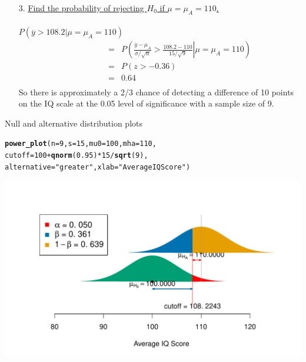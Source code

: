 \documentclass[10pt]{beamer}\usepackage[]{graphicx}\usepackage[]{color}
\makeatletter
\def\maxwidth{ %
  \ifdim\Gin@nat@width>\linewidth
    \linewidth
  \else
    \Gin@nat@width
  \fi
}
\newcommand{\hlnum}[1]{\textcolor[rgb]{0.686,0.059,0.569}{#1}}%
\newcommand{\hlstr}[1]{\textcolor[rgb]{0.192,0.494,0.8}{#1}}%
\newcommand{\hlopt}[1]{\textcolor[rgb]{0,0,0}{#1}}%
\newcommand{\hlstd}[1]{\textcolor[rgb]{0.345,0.345,0.345}{#1}}%
\newcommand{\hlkwc}[1]{\textcolor[rgb]{0.333,0.667,0.333}{#1}}%
\newcommand{\hlkwd}[1]{\textcolor[rgb]{0.737,0.353,0.396}{\textbf{#1}}}%
\newenvironment{kframe}{%
 \def\at@end@of@kframe{}%
 \ifinner\ifhmode%
  \def\at@end@of@kframe{\end{minipage}}%
  \begin{minipage}{\columnwidth}%
 \fi\fi%
 \def\FrameCommand##1{\hskip\@totalleftmargin \hskip-\fboxsep
 \colorbox{shadecolor}{##1}\hskip-\fboxsep
     \hskip-\linewidth \hskip-\@totalleftmargin \hskip\columnwidth}%
 \MakeFramed {\advance\hsize-\width
   \@totalleftmargin\z@ \linewidth\hsize
   \@setminipage}}%
 {\par\unskip\endMakeFramed%
 \at@end@of@kframe}
\newenvironment{knitrout}{}{} %
\makeatother
\begin{document}
{	\begin{enumerate}
		\item[3.] \underline{Find the probability of rejecting $H_0$ if
			$\mu=\mu_A=110$.}\\ \ \\
		$P(\overline{y} > 108.2|\mu=\mu_A=110) $
		\begin{eqnarray*} \qquad \qquad & = &
			P\left(\left.\frac{\overline{y}-\mu_A}{\sigma/\sqrt{n}}
			> \frac{108.2-110}{15/\sqrt{9}}\right|\mu=\mu_A=110\right)\\
			& = & P\left(z > -0.36\right)\\
			& = & 0.64\\
		\end{eqnarray*}
		So there is approximately a 2/3 chance of detecting a difference of
		10 points on the IQ scale at the 0.05 level of significance with a
		sample size of 9.
	\end{enumerate}
} 


\begin{frame}[fragile]{Null and alternative distribution plots}
\begin{knitrout}\tiny
{}\color{fgcolor}\begin{kframe}
\begin{alltt}
\hlkwd{power_plot}\hlstd{(}\hlkwc{n} \hlstd{=} \hlnum{9}\hlstd{,} \hlkwc{s} \hlstd{=} \hlnum{15}\hlstd{,} \hlkwc{mu0} \hlstd{=} \hlnum{100}\hlstd{,} \hlkwc{mha} \hlstd{=} \hlnum{110}\hlstd{,}
\hlkwc{cutoff} \hlstd{=} \hlnum{100} \hlopt{+} \hlkwd{qnorm}\hlstd{(}\hlnum{0.95}\hlstd{)} \hlopt{*} \hlnum{15} \hlopt{/} \hlkwd{sqrt}\hlstd{(}\hlnum{9}\hlstd{),}
\hlkwc{alternative} \hlstd{=} \hlstr{"greater"}\hlstd{,} \hlkwc{xlab} \hlstd{=} \hlstr{"Average IQ Score"}\hlstd{)}
\end{alltt}
\end{kframe}

{\centering \includegraphics[width=\maxwidth]{figure/unnamed-chunk-18-1} 

}



\end{knitrout}
\end{frame}
\end{document}
